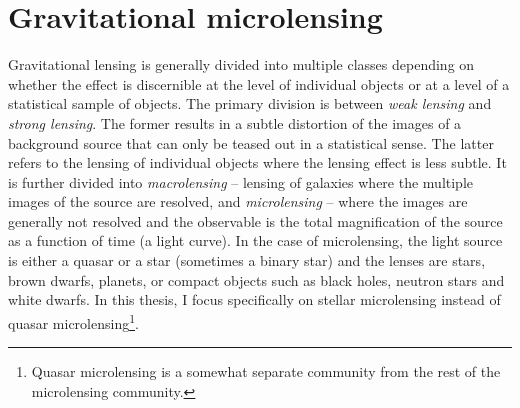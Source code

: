 \documentclass[12pt,dvipsnames]{report}
\begin{document}
\section{Gravitational microlensing}
\label{sec:microlensing}
Gravitational lensing is generally divided into multiple classes depending
on whether the effect is discernible at the level of individual objects or 
at a level of a statistical sample of objects. 
The primary division is between \emph{weak lensing} and \emph{strong lensing}.
The former results in a subtle distortion of the images of a background source
that can only be teased out in a statistical sense. The latter refers 
to the lensing of individual objects where the lensing effect is less subtle. 
It is further divided into
\emph{macrolensing} -- lensing of galaxies where the multiple images of the source
are resolved, and \emph{microlensing}  -- where the images are generally not resolved
and the observable is the total magnification of the source as a function of time (a light curve).
In the case of microlensing, the light source is either a quasar or a star (sometimes a binary star)
and the lenses are stars, brown dwarfs, planets, or compact objects such as black holes, neutron
stars and white dwarfs. In this thesis, I focus specifically on stellar microlensing
instead of quasar microlensing\footnote{Quasar microlensing
    is a somewhat separate community from the rest of the microlensing community.}.
\end{document}
